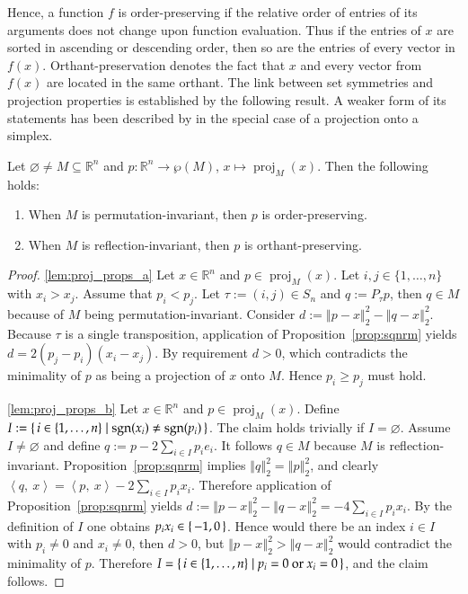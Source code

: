 \documentclass[twoside,11pt]{article}
\DeclareMathOperator{\proj}{proj}
\DeclareMathOperator{\sgn}{sgn}
\newcommand{\R}{\mathbb{R}}
\newcommand{\0}{\mathcal{O}}
\newcommand{\norm}[1]{\left\Vert#1\right\Vert}
\newcommand{\scp}[2]{\left<#1,\ #2\right>}
\newcommand{\discint}[2]{\{#1,\dotsc,#2\}}
\newcommand{\inint}[2]{\in\discint{#1}{#2}}
\renewcommand{\P}{\wp}
\renewcommand{\emptyset}{\varnothing}
\begin{document}
Hence, a function $f$ is order-preserving if the relative order of entries of its arguments does not change upon function evaluation.
Thus if the entries of $x$ are sorted in ascending or descending order, then so are the entries of every vector in $f(x)$.
Orthant-preservation denotes the fact that $x$ and every vector from $f(x)$ are located in the same orthant.
The link between set symmetries and projection properties is established by the following result.
A weaker form of its statements has been described by \citet{Duchi2008} in the special case of a projection onto a simplex.
\begin{lemma}
\label{lem:proj_props}
Let $\emptyset\neq M\subseteq\R^n$ and $p\colon\R^n\to\P(M)$, $x\mapsto\proj_M(x)$.
Then the following holds:
\begin{enumerate}
\item \label{lem:proj_props_a}
When $M$ is permutation-invariant, then $p$ is order-preserving.

\item \label{lem:proj_props_b}
When $M$ is reflection-invariant, then $p$ is orthant-preserving.

\end{enumerate}
\end{lemma}
\begin{proof}
\ref{lem:proj_props_a}
Let $x\in\R^n$ and $p\in\proj_M(x)$.
Let $i,j\inint{1}{n}$ with $x_i > x_j$.
Assume that $p_i < p_j$.
Let $\tau := (i, j)\in S_n$ and $q := P_\tau p$, then $q\in M$ because of $M$ being permutation-invariant.
Consider $d := \norm{p - x}_2^2 - \norm{q - x}_2^2$.
Because $\tau$ is a single transposition, application of Proposition~\ref{prop:sqnrm} yields $d = 2(p_j - p_i)(x_i - x_j)$.
By requirement $d > 0$, which contradicts the minimality of $p$ as being a projection of $x$ onto $M$.
Hence $p_i \geq p_j$ must hold.

\ref{lem:proj_props_b}
Let $x\in\R^n$ and $p\in\proj_M(x)$.
Define $I := \set{i\inint{1}{n} | \sgn(x_i) \neq \sgn(p_i)}$.
The claim holds trivially if $I = \emptyset$.
Assume $I\neq\emptyset$ and define $q := p - 2\sum_{i\in I}p_ie_i$.
It follows $q\in M$ because $M$ is reflection-invariant.
Proposition~\ref{prop:sqnrm} implies $\norm{q}_2^2 = \norm{p}_2^2$, and clearly $\scp{q}{x} = \scp{p}{x} - 2\sum_{i\in I}p_ix_i$.
Therefore application of Proposition~\ref{prop:sqnrm} yields $d := \norm{p - x}_2^2 - \norm{q - x}_2^2 = -4\sum_{i\in I}p_ix_i$.
By the definition of $I$ one obtains $p_ix_i\in\set{-1, 0}$.
Hence would there be an index $i\in I$ with $p_i\neq 0$ and $x_i\neq 0$, then $d > 0$, but $\norm{p - x}_2^2 > \norm{q - x}_2^2$ would contradict the minimality of $p$.
Therefore $I = \set{i\inint{1}{n} | p_i = 0\text{ or } x_i = 0}$, and the claim follows.
\end{proof}
\end{document}

